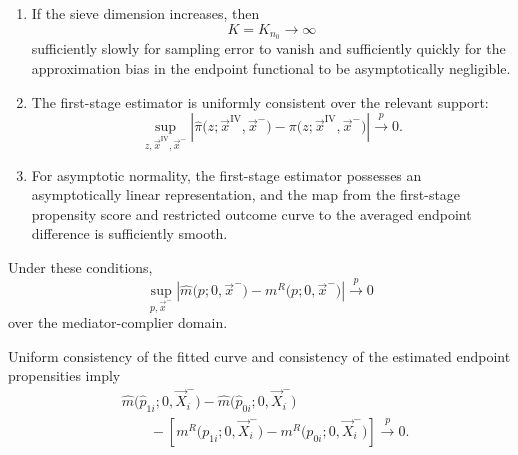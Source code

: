 \begin{enumerate}[label=\textbf{(\arabic*)}]
    \item
    If the sieve dimension increases, then
    \[
        K=K_{n_0}
        \longrightarrow
        \infty
    \]
    sufficiently slowly for sampling error to vanish and sufficiently quickly for the approximation bias in the endpoint functional to be asymptotically negligible.

    \item
    The first-stage estimator is uniformly consistent over the relevant support:
    \[
        \sup_{
            z,\vec x^{\mathrm{IV}},\vec x^-
        }
        \left|
            \widehat\pi
            \big(
                z;
                \vec x^{\mathrm{IV}},
                \vec x^-
            \big)
            -
            \pi
            \big(
                z;
                \vec x^{\mathrm{IV}},
                \vec x^-
            \big)
        \right|
        \overset{p}{\longrightarrow}
        0.
    \]

    \item
    For asymptotic normality, the first-stage estimator possesses an asymptotically linear representation, and the map from the first-stage propensity score and restricted outcome curve to the averaged endpoint difference is sufficiently smooth.

\end{enumerate}

Under these conditions,
\[
    \sup_{
        p,\vec x^-
    }
    \left|
        \widehat m
        \big(
            p;
            0,
            \vec x^-
        \big)
        -
        m^R
        \big(
            p;
            0,
            \vec x^-
        \big)
    \right|
    \overset{p}{\longrightarrow}
    0
    \label{eqn:uniform-outcome-curve-consistency}
\]
over the mediator-complier domain.

Uniform consistency of the fitted curve and consistency of the estimated endpoint propensities imply
\[
    \begin{aligned}
    &
    \widehat m
    \big(
        \widehat p_{1i};
        0,
        \vec X_i^-
    \big)
    -
    \widehat m
    \big(
        \widehat p_{0i};
        0,
        \vec X_i^-
    \big)
    \\
    &\qquad-
    \left[
        m^R
        \big(
            p_{1i};
            0,
            \vec X_i^-
        \big)
        -
        m^R
        \big(
            p_{0i};
            0,
            \vec X_i^-
        \big)
    \right]
    \overset{p}{\longrightarrow}
    0.
    \end{aligned}
\]

